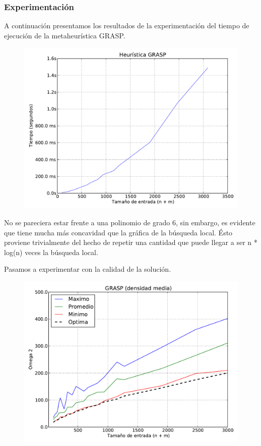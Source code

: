 \subsubsection{Experimentación}

A continuación presentamos los resultados de la experimentación del tiempo de ejecución de la metaheurística GRASP.

\begin{figure}[H]
\begin{center}
\includegraphics[angle=0, scale=.75]{imagenes/grasp_2014-06-27_19-18-59.pdf}
\label{grafico local}
\end{center}
\end{figure}

No se pareciera estar frente a una polinomio de grado 6, sin embargo, es evidente que tiene mucha más concavidad que la gráfica de la búsqueda
local. Ésto proviene trivialmente del hecho de repetir una cantidad que puede llegar a ser n * log(n) veces la búsqueda local.

Pasamos a experimentar con la calidad de la solución.

\begin{figure}[H]
\begin{center}
\includegraphics[angle=0, scale=.75]{imagenes/calidad_grasp_2014-06-27_08-58-53.pdf}
\label{grafico local}
\end{center}
\end{figure}

